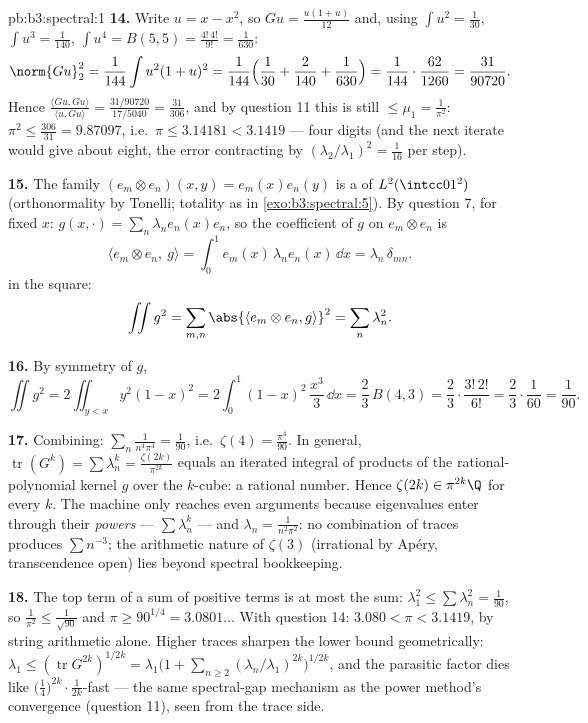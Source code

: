 \begin{solution}{pb:b3:spectral:1}
\textbf{14.} Write $u = x - x^2$, so $Gu =
\frac{u(1 + u)}{12}$ and, using $\int u^2 = \frac1{30}$,
$\int u^3 = \frac1{140}$, $\int u^4 = B(5,5) =
\frac{4!\,4!}{9!} = \frac1{630}$:
\[
\norm{Gu}_2^2 = \frac1{144}\int u^2(1+u)^2 =
\frac1{144}\Bigl(\frac1{30} + \frac2{140} +
\frac1{630}\Bigr) = \frac1{144}\cdot\frac{62}{1260} =
\frac{31}{90720} .
\]
Hence $\frac{\langle Gu, Gu\rangle}{\langle u, Gu\rangle} =
\frac{31/90720}{17/5040} = \frac{31}{306}$, and by question
11 this is still $\leq \mu_1 = \frac1{\pi^2}$: $\pi^2 \leq
\frac{306}{31} = 9.87097$, i.e.\ $\pi \leq 3.14181 <
3.1419$ --- four digits (and the next iterate would give
about eight, the error contracting by
$(\lambda_2/\lambda_1)^2 = \frac1{16}$ per step).

\textbf{15.} The family $(e_m \otimes e_n)(x,y) =
e_m(x)e_n(y)$ is a  of $L^2(\intcc01^2)$
(orthonormality by Tonelli; totality as in
\cref{exo:b3:spectral:5}). By question 7, for fixed $x$:
$g(x, \cdot) = \sum_n\lambda_ne_n(x)e_n$, so the coefficient
of $g$ on $e_m\otimes e_n$ is
\[
\langle e_m\otimes e_n,\ g\rangle
= \int_0^1 e_m(x)\,\lambda_n e_n(x)\,\dd x
= \lambda_n\,\delta_{mn} .
\]
 in the square:
\[
\iint g^2 = \sum_{m,n}\abs{\langle e_m\otimes e_n,
g\rangle}^2 = \sum_n\lambda_n^2 .
\]

\textbf{16.} By symmetry of $g$,
\[
\iint g^2 = 2\iint_{y<x}y^2(1-x)^2
= 2\int_0^1(1-x)^2\,\frac{x^3}3\,\dd x
= \frac23\,B(4, 3) = \frac23\cdot\frac{3!\,2!}{6!}
= \frac23\cdot\frac1{60} = \frac1{90} .
\]

\textbf{17.} Combining: $\sum_n\frac1{n^4\pi^4} =
\frac1{90}$, i.e.\ $\zeta(4) = \frac{\pi^4}{90}$. In
general, $\operatorname{tr}(G^k) = \sum\lambda_n^k =
\frac{\zeta(2k)}{\pi^{2k}}$ equals an iterated integral of
products of the rational-polynomial kernel $g$ over the
$k$-cube: a rational number. Hence $\zeta(2k) \in
\pi^{2k}\Q$ for every $k$. The machine only reaches even
arguments because eigenvalues enter through their
\emph{powers} --- $\sum\lambda_n^k$ --- and $\lambda_n =
\frac1{n^2\pi^2}$: no combination of traces produces $\sum
n^{-3}$; the arithmetic nature of $\zeta(3)$ (irrational by
Ap\'ery, transcendence open) lies beyond spectral
bookkeeping.

\textbf{18.} The top term of a sum of positive terms is at
most the sum: $\lambda_1^2 \leq \sum\lambda_n^2 =
\frac1{90}$, so $\frac1{\pi^2} \leq \frac1{\sqrt{90}}$ and
$\pi \geq 90^{1/4} = 3.0801\ldots$ With question 14:
$3.080 < \pi < 3.1419$, by string arithmetic alone. Higher
traces sharpen the lower bound geometrically:
$\lambda_1 \leq (\operatorname{tr}G^{2k})^{1/2k} =
\lambda_1\bigl(1 + \sum_{n\geq2}(\lambda_n/\lambda_1)^{2k}
\bigr)^{1/2k}$, and the parasitic factor dies like
$\bigl(\tfrac14\bigr)^{2k}\cdot\frac1{2k}$-fast --- the same
spectral-gap mechanism as the power method's convergence
(question 11), seen from the trace side.


\end{solution}
